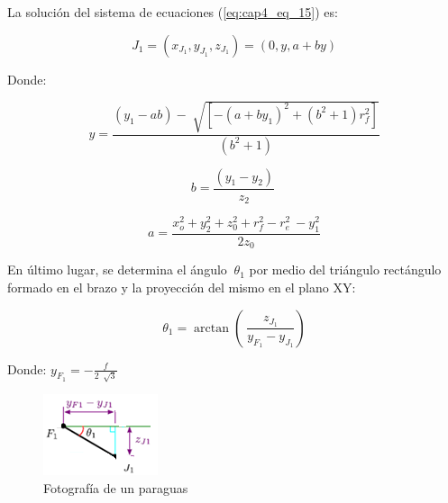 La solución del sistema de ecuaciones (\ref{eq:cap4_eq_15}) es:

    \begin{equation}
    J_{1}= \left( x_{J_{1}},y_{J_{1}},z_{J_{1}} \right) = \left( 0,y,a+by \right)
    \label{eq:cap4_eq_16}
    \end{equation}

    Donde:

    \begin{equation}
        y=\frac{\left( y_{1}-ab \right) -\sqrt[]{ \left[  -\left( a+by_{1} \right) ^{2}+ \left( b^{2}+1 \right) r_{f}^{2} \right] }}{ \left( b^{2}+1 \right) }
    \label{eq:cap4_eq_17}
    \end{equation}

    \begin{equation}
        b=\frac{ \left( y_{1}-y_{2} \right) }{z_{2}}~ 
    \label{eq:cap4_eq_18}
    \end{equation}
    
    \begin{equation}
        a= \frac{x_{o}^{2}+y_{2}^{2}+z_{0}^{2}+r_{f}^{2}- r_{e}^{2}~-y_{1}^{2}}{2z_{0}} 
    \label{eq:cap4_eq_19}
    \end{equation}

                \newpage

En último lugar, se determina el ángulo \( ~ \theta _{1} \)  por medio del triángulo rectángulo formado en el brazo y la proyección del mismo en el plano XY:

    \begin{equation}
        \theta _{1}=\arctan  \left( ~\frac{z_{J_{1}}}{y_{F_{1}}-y_{J_{1}}} \right)  
        \label{eq:cap4_eq_20}
    \end{equation}
    
    Donde:  \( y_{F_{1}}= - \frac{f}{2~\sqrt[]{3}} \)

    
        \begin{figure}[htb]
             \centering
             \includegraphics[width=0.25\linewidth]{Main/Chapter4/Images4/Metodo_A_Modelacion_Cinematica_Posicion_5.png}
              \caption{Fotografía de un paraguas}
              \label{f:Cap4_Metodo_A_Modelacion_Cinematica_Posicion_5}
        \end{figure}




